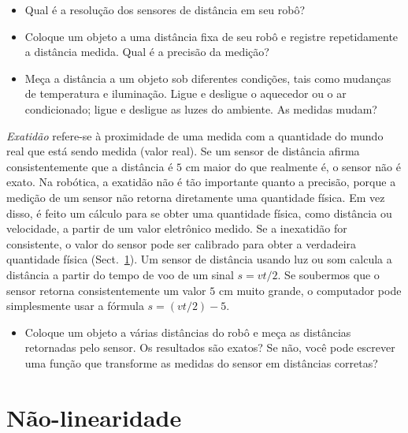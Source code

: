 \begin{framed}
\begin{itemize}
\item Qual é a resolução dos sensores de distância em seu robô?
\item Coloque um objeto a uma distância fixa de seu robô e registre repetidamente a distância medida. Qual é a precisão da medição?
\item Meça a distância a um objeto sob diferentes condições, tais como mudanças de temperatura e iluminação. Ligue e desligue o aquecedor ou o ar condicionado; ligue e desligue as luzes do ambiente. As medidas mudam?
\end{itemize}
\end{framed}

\emph{Exatidão} refere-se à proximidade de uma medida com a quantidade do mundo real que está sendo medida (valor real). Se um sensor de distância afirma consistentemente que a distância é $5$ cm maior do que realmente é, o sensor não é exato. Na robótica, a exatidão não é tão importante quanto a precisão, porque a medição de um sensor não retorna diretamente uma quantidade física. Em vez disso, é feito um cálculo para se obter uma quantidade física, como distância ou velocidade, a partir de um valor eletrônico medido. Se a inexatidão for consistente, o valor do sensor pode ser calibrado para obter a verdadeira quantidade física (Sect.~\ref{s.nonlinearity}). Um sensor de distância usando luz ou som calcula a distância a partir do tempo de voo de um sinal $s=vt/2$. Se soubermos que o sensor retorna consistentemente um valor $5$ cm muito grande, o computador pode simplesmente usar a fórmula $s=(vt/2) - 5$.

\begin{framed}
\begin{itemize}
\item Coloque um objeto a várias distâncias do robô e meça as distâncias retornadas pelo sensor. Os resultados são exatos? Se não, você pode escrever uma função que transforme as medidas do sensor em distâncias corretas?
\end{itemize}
\end{framed}

\section{Não-linearidade}\label{s.nonlinearity}


